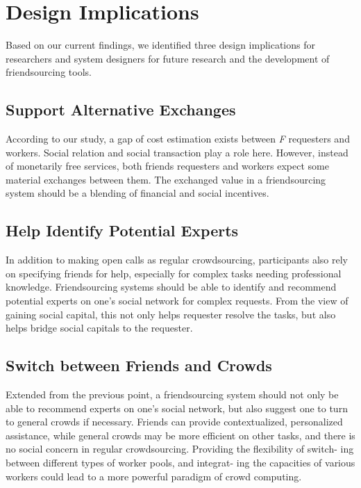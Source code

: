 \section{Design Implications}

Based on our current findings, 
we identified three design implications for researchers and system designers for future research and the development of friendsourcing tools.

\subsection{Support Alternative Exchanges}
According to our study, 
a gap of cost estimation exists between \emph{F} requesters and workers. 
Social relation and social transaction play a role here. 
However, instead of monetarily free services, 
both friends requesters and workers expect some material exchanges between them.
The exchanged value in a friendsourcing system should be a blending of financial and social incentives.

\subsection{Help Identify Potential Experts}
In addition to making open calls as regular crowdsourcing, 
participants also rely on specifying friends for help, especially for complex tasks needing professional knowledge.
Friendsourcing systems should be able to identify and recommend potential experts on one's social network for complex requests. 
From the view of gaining social capital, this not only helps requester resolve the tasks, 
but also helps bridge social capitals to the requester.

\subsection{Switch between Friends and Crowds}
Extended from the previous point, 
a friendsourcing system should not only be able to recommend experts on one's social network, 
but also suggest one to turn to general crowds if necessary. 
Friends can provide contextualized, personalized assistance, 
while general crowds may be more efficient on other tasks, and there is no social concern in regular crowdsourcing. 
Providing the flexibility of switch- ing between different types of worker pools, 
and integrat- ing the capacities of various workers could lead to a more powerful paradigm of crowd computing.






